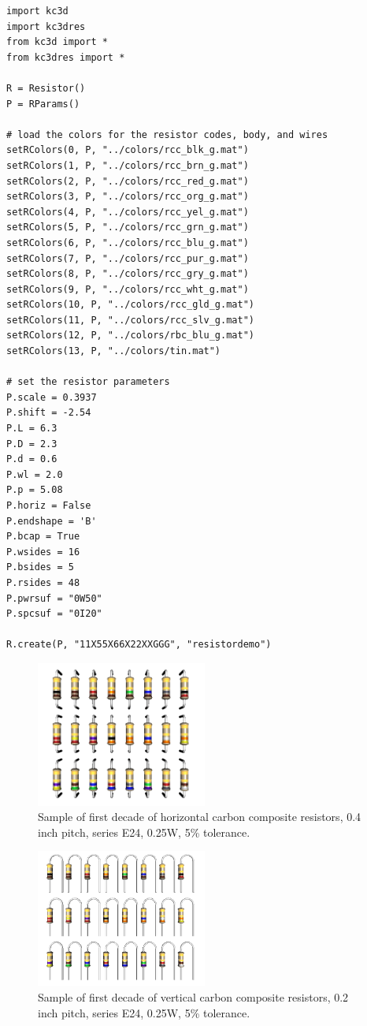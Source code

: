 \begin{verbatim}
import kc3d
import kc3dres
from kc3d import *
from kc3dres import *

R = Resistor()
P = RParams()

# load the colors for the resistor codes, body, and wires
setRColors(0, P, "../colors/rcc_blk_g.mat")
setRColors(1, P, "../colors/rcc_brn_g.mat")
setRColors(2, P, "../colors/rcc_red_g.mat")
setRColors(3, P, "../colors/rcc_org_g.mat")
setRColors(4, P, "../colors/rcc_yel_g.mat")
setRColors(5, P, "../colors/rcc_grn_g.mat")
setRColors(6, P, "../colors/rcc_blu_g.mat")
setRColors(7, P, "../colors/rcc_pur_g.mat")
setRColors(8, P, "../colors/rcc_gry_g.mat")
setRColors(9, P, "../colors/rcc_wht_g.mat")
setRColors(10, P, "../colors/rcc_gld_g.mat")
setRColors(11, P, "../colors/rcc_slv_g.mat")
setRColors(12, P, "../colors/rbc_blu_g.mat")
setRColors(13, P, "../colors/tin.mat")

# set the resistor parameters
P.scale = 0.3937
P.shift = -2.54
P.L = 6.3
P.D = 2.3
P.d = 0.6
P.wl = 2.0
P.p = 5.08
P.horiz = False
P.endshape = 'B'
P.bcap = True
P.wsides = 16
P.bsides = 5
P.rsides = 48
P.pwrsuf = "0W50"
P.spcsuf = "0I20"

R.create(P, "11X55X66X22XXGGG", "resistordemo")
\end{verbatim}


\begin{figure}
\label{fig:k3dres-horiz}
\centering
\includegraphics[width = 0.5\textwidth]{img/k3dres-horiz.png}
\caption{Sample of first decade of horizontal carbon composite resistors,
0.4 inch pitch, series E24, 0.25W, 5\% tolerance.}
\end{figure}

\begin{figure}
\label{fig:k3dres-vert}
\centering
\includegraphics[width = 0.5\textwidth]{img/k3dres-vertical.png}
\caption{Sample of first decade of vertical carbon composite resistors,
0.2 inch pitch, series E24, 0.25W, 5\% tolerance.}
\end{figure}
